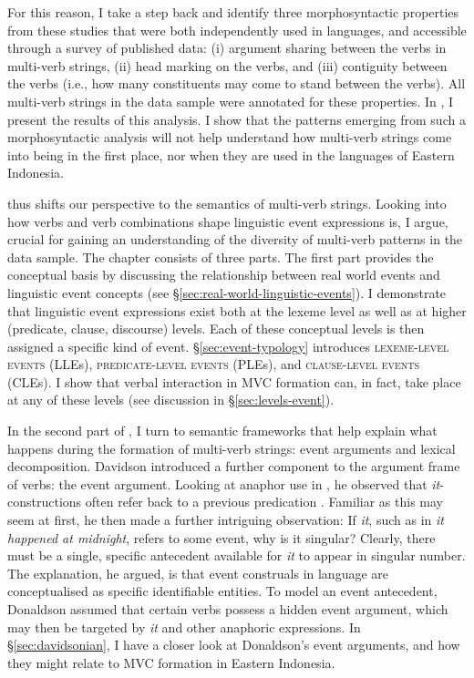 For this reason, I take a step back and identify three morphosyntactic properties from these studies that were both independently used in languages, and accessible through a survey of published data: (i) argument sharing between the verbs in multi-verb strings, (ii) head marking on the verbs, and (iii) contiguity between the verbs (i.e., how many constituents may come to stand between the verbs). All multi-verb strings in the data sample were annotated for these properties. In , I present the results of this analysis. I show that the patterns emerging from such a morphosyntactic analysis will not help understand how multi-verb strings come into being in the first place, nor when they are used in the languages of Eastern Indonesia.

 thus shifts our perspective to the semantics of multi-verb strings. Looking into how verbs and verb combinations shape linguistic event expressions is, I argue, crucial for gaining an understanding of the diversity of multi-verb patterns in the data sample. The chapter consists of three parts. The first part provides the conceptual basis by discussing the relationship between real world events and linguistic event concepts (see §\ref{sec:real-world-linguistic-events}). I demonstrate that linguistic event expressions exist both at the lexeme level as well as at higher (predicate, clause, discourse) levels. Each of these conceptual levels is then assigned a specific kind of event. §\ref{sec:event-typology} introduces \textsc{lexeme-level events} (LLEs), \textsc{predicate-level events} (PLEs), and \textsc{clause-level events} (CLEs). I show that verbal interaction in MVC formation can, in fact, take place at any of these levels (see discussion in §\ref{sec:levels-event}). 

In the second part of , I turn to semantic frameworks that help explain what happens during the formation of multi-verb strings: event arguments and lexical decomposition. Davidson introduced a further component to the argument frame of verbs: the event argument. Looking at anaphor use in , he observed that \textit{it}-constructions often refer back to a previous predication \citep{davidson1967logical}. Familiar as this may seem at first, he then made a further intriguing observation: If \textit{it}, such as in \textit{it happened at midnight}, refers to some event, why is it singular? Clearly, there must be a single, specific antecedent available for \textit{it} to appear in singular number. The explanation, he argued, is that event construals in language are conceptualised as specific identifiable entities. To model an event antecedent, Donaldson assumed that certain verbs possess a hidden event argument, which may then be targeted by \textit{it} and other anaphoric expressions. In §\ref{sec:davidsonian}, I have a closer look at Donaldson's event arguments, and how they might relate to MVC formation in Eastern Indonesia. 

